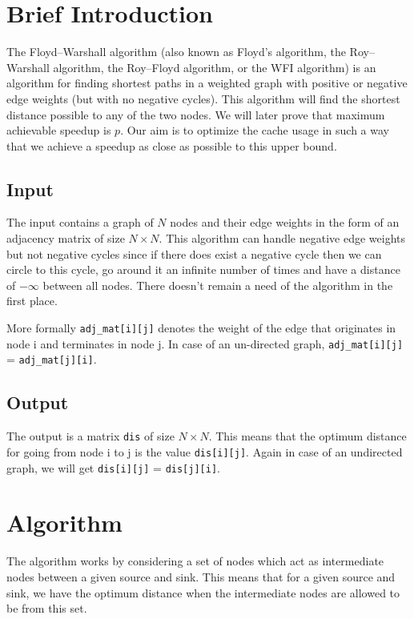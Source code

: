 \documentclass{article}
\begin{document}
\section{Brief Introduction}
The Floyd–Warshall algorithm (also known as Floyd's algorithm, the Roy–Warshall algorithm, the Roy–Floyd algorithm, or the WFI algorithm) is an algorithm for finding shortest paths in a weighted graph with positive or negative edge weights (but with no negative cycles). This algorithm will find the shortest distance possible to any of the two nodes. We will later prove that maximum achievable speedup is $p$. Our aim is to optimize the cache usage in such a way that we achieve a speedup as close as possible to this upper bound.

\subsection{Input}
The input contains a graph of $N$ nodes and their edge weights in the form of an adjacency matrix of size $N \times N$. This algorithm can handle negative edge weights but not negative cycles since if there does exist a negative cycle then we can circle to this cycle, go around it an infinite number of times and have a distance of $- \infty$ between all nodes. There doesn't remain a need of the algorithm in the first place.

More formally \texttt{adj\_mat[i][j]} denotes the weight of the edge that originates in node i and terminates in node j. In case of an un-directed graph, \texttt{adj\_mat[i][j]} =  \texttt{adj\_mat[j][i]}.


\subsection{Output}
The output is a matrix \texttt{dis} of size $N \times N$. This means that the optimum distance for going from node i to j is the value \texttt{dis[i][j]}. Again in case of an undirected graph, we will get \texttt{dis[i][j]} =  \texttt{dis[j][i]}. 

\section{Algorithm}
The algorithm works by considering a set of nodes which act as intermediate nodes between a given source and sink. This means that for a given source and sink, we have the optimum distance when the intermediate nodes are allowed to be from this set. 
\end{document}
